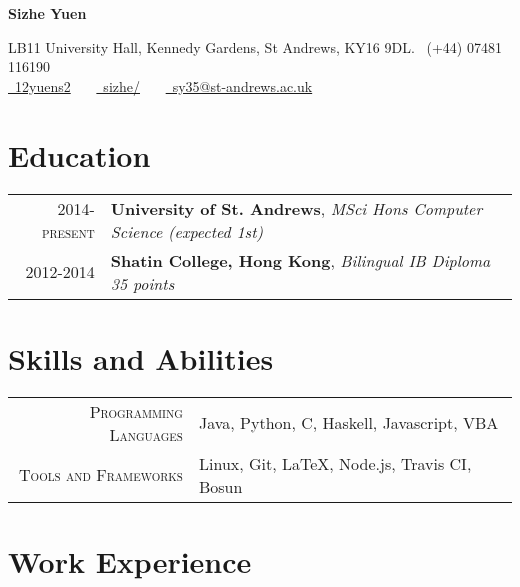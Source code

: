 \documentclass{article}
\begin{document}
\pagestyle{empty} %


\par{\centering
		{\Large \textbf{Sizhe Yuen}
	}\par}

\begin{center}
LB11 University Hall, Kennedy Gardens, St Andrews, KY16 9DL. \faMobile\ (+44) 07481 116190\\
\href{https://github.com/12yuens2}{\faGithub\ 12yuens2} \ \ \ \href{https://www.linkedin.com/in/sizhe/}{\faLinkedin\ sizhe/} \ \ \ \href{mailto:sy35@st-andrews.ac.uk}{\faEnvelopeO\ sy35@st-andrews.ac.uk}
\end{center}


\section*{Education}
\begin{tabular}{r|p{15cm}}
\textsc{2014-present} & \textbf{University of St. Andrews}, \textit{MSci Hons Computer Science (expected 1st)}
\\
\textsc{2012-2014} & \textbf{Shatin College, Hong Kong}, \textit{Bilingual IB Diploma 35 points}
\end{tabular}

\section*{Skills and Abilities}
\begin{tabular}{r|p{15cm}}
\textsc{Programming Languages} & Java, Python, C, Haskell, Javascript, VBA\\

\textsc{Tools and Frameworks} & Linux, Git, \LaTeX, Node.js, Travis CI, Bosun
\end{tabular}

\section*{Work Experience}
\end{document}
